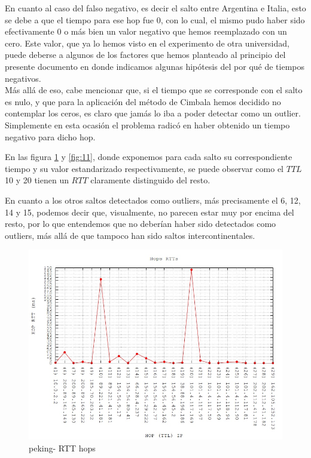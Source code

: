 En cuanto al caso del falso negativo, es decir el salto entre Argentina e Italia, esto se debe a que el tiempo para ese hop fue 0, con lo cual, el mismo pudo haber sido efectivamente 0 o más bien un valor negativo que hemos reemplazado con un cero. Este valor, que ya lo hemos visto en el experimento de otra universidad, puede deberse a algunos de los factores que hemos planteado al principio del presente documento en donde indicamos algunas hipótesis del por qué de tiempos negativos. \\
Más allá de eso, cabe mencionar que, si el tiempo que se corresponde con el salto es nulo, y que para la aplicación del método de Cimbala hemos decidido no contemplar los ceros, es claro que jamás lo iba a poder detectar como un outlier. Simplemente en esta ocasión el problema radicó en haber obtenido un tiempo negativo para dicho hop.


En las figura \ref{fig:10} y \ref{fig:11}, donde exponemos para cada salto su correspondiente tiempo y su valor estandarizado respectivamente, se puede observar como el $TTL$ 10 y 20 tienen un $RTT$ claramente distinguido del resto. 

En cuanto a los otros saltos detectados como outliers, más precisamente el 6, 12, 14 y 15, podemos decir que, visualmente, no parecen estar muy por encima del resto, por lo que entendemos que no deberían haber sido detectados como outliers, más allá de que tampoco han sido saltos intercontinentales.

\begin{figure}[!htbp]
  \centering
    \includegraphics[scale=0.5]{imagenes/peking-graficos/traceroute-peking.jpg}
  \caption{peking- RTT hops}
  \label{fig:10}
\end{figure}


